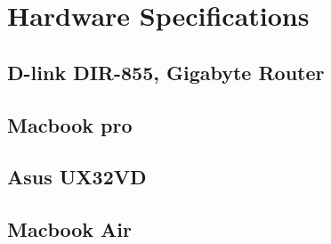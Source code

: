 
\chapter{Hardware Specifications}\label{appendix:HardwareSpecification}


\section{D-link DIR-855, Gigabyte Router}



\section{Macbook pro}\label{appendix:hardwareSpecification_pro}

\section{Asus UX32VD}\label{appendix:hardwareSpecification_asus}

\section{Macbook Air}\label{appendix:hardwareSpecification_air}